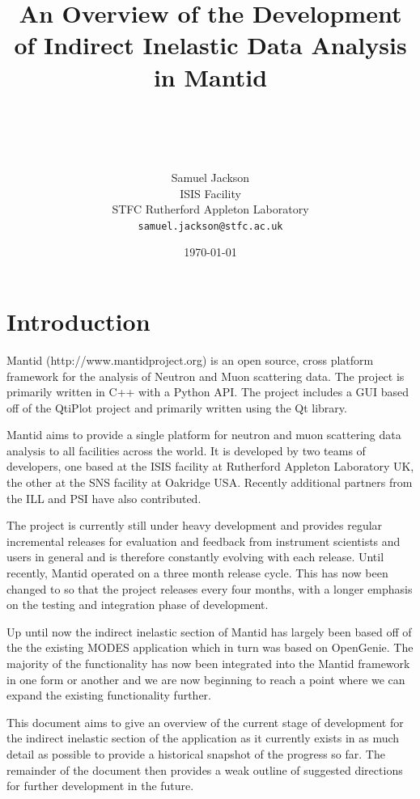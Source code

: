 \documentclass[paper=a4, fontsize=11pt]{scrartcl}	%
\title{ \vspace{-1in} 	\usefont{OT1}{bch}{b}{n}
		\huge \strut An Overview of the Development of Indirect Inelastic Data Analysis in Mantid\strut \\
}
\author{ 									\usefont{OT1}{bch}{m}{n}
        Samuel Jackson\\		\usefont{OT1}{bch}{m}{n}
		ISIS Facility\\	\usefont{OT1}{bch}{m}{n}
        STFC Rutherford Appleton Laboratory\\
        \texttt{samuel.jackson@stfc.ac.uk}
}
\date{\today}
\numberwithin{equation}{section}															%
\numberwithin{figure}{section}																%
\numberwithin{table}{section}																%
\begin{document}
\maketitle
\clearpage
\tableofcontents
\section{Introduction}
Mantid (http://www.mantidproject.org) is an open source, cross platform framework for the analysis of Neutron and Muon scattering data. The project is primarily written in C++ with a Python API. The project includes a GUI based off of the QtiPlot project and primarily written using the Qt library.

Mantid aims to provide a single platform for neutron and muon scattering data analysis to all facilities across the world. It is developed by two teams of developers, one based at the ISIS facility at Rutherford Appleton Laboratory UK, the other at the SNS facility at Oakridge USA. Recently additional partners from the ILL and PSI have also contributed.

The project is currently still under heavy development and provides regular incremental releases for evaluation and feedback from instrument scientists and users in general and is therefore constantly evolving with each release. Until recently, Mantid operated on a three month release cycle. This has now been changed to so that the project releases every four months, with a longer emphasis on the testing and integration phase of development.

Up until now the indirect inelastic section of Mantid has largely been based off of the the existing MODES application which in turn was based on OpenGenie\cite{wshowells2010}. The majority of the functionality has now been integrated into the Mantid framework in one form or another and we are now beginning to reach a point where we can expand the existing functionality further.

This document aims to give an overview of the current stage of development for the indirect inelastic section of the application as it currently exists in as much detail as possible to provide a historical snapshot of the progress so far. The remainder of the document then provides a weak outline of suggested directions for further development in the future.
\end{document}
